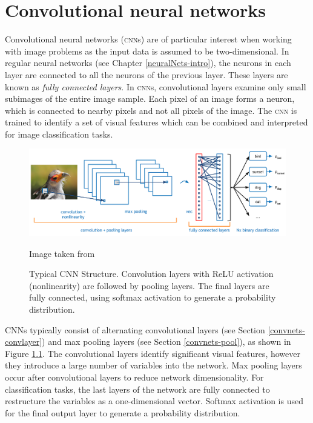%
%

\chapter{Convolutional neural networks}\label{convnets}

Convolutional neural networks (\textsc{cnn}s) are of particular interest when working with image problems as the input data is assumed to be two-dimensional. In regular neural networks (see Chapter \ref{neuralNets-intro}), the neurons in each layer are connected to all the neurons of the previous layer. These layers are known as \textit{fully connected layers}. In \textsc{cnn}s, convolutional layers examine only small subimages of the entire image sample. Each pixel of an image forms a neuron, which is connected to nearby pixels and not all pixels of the image. The \textsc{cnn} is trained to identify a set of visual features which can be combined and interpreted for image classification tasks.

\begin{figure}[ht]
	\centering
	\includegraphics[width=\textwidth]{Images/4_cnn_structure.png}
	\caption{Typical CNN Structure. Convolution layers with ReLU activation (nonlinearity) are followed by pooling layers. The final layers are fully connected, using softmax activation to generate a probability distribution.}
	\small Image taken from \cite{ADeshpande2016}
	\label{convnets-structurefig}
\end{figure}

CNNs typically consist of alternating convolutional layers (see Section \ref{convnets-convlayer}) and max pooling layers (see Section \ref{convnets-pool}), as shown in Figure \ref{convnets-structurefig}. The convolutional layers identify significant visual features, however they introduce a large number of variables into the network. Max pooling layers occur after convolutional layers to reduce network dimensionality. For classification tasks, the last layers of the network are fully connected to restructure the variables as a one-dimensional vector. Softmax activation is used for the final output layer to generate a probability distribution.

